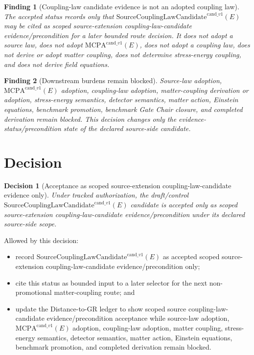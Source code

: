 \documentclass[11pt]{article}
\newcommand{\SCLC}{\mathrm{SourceCouplingLawCandidate}^{\mathrm{cand}\_v1}}
\newcommand{\MCPA}{\mathrm{MCPA}^{\mathrm{cand}\_v1}}
\newtheorem{decision}{Decision}
\newtheorem{finding}{Finding}
\begin{document}
\begin{finding}[Coupling-law candidate evidence is not an adopted coupling law]
The accepted status records only that \(\SCLC(E)\) may be cited as scoped
source-extension coupling-law-candidate evidence/precondition for a later
bounded route decision. It does not adopt a source law, does not adopt
\(\MCPA(E)\), does not adopt a coupling law, does not derive or adopt matter
coupling, does not determine stress-energy coupling, and does not derive
field equations.
\end{finding}

\begin{finding}[Downstream burdens remain blocked]
Source-law adoption, \(\MCPA(E)\) adoption, coupling-law adoption,
matter-coupling derivation or adoption, stress-energy semantics, detector
semantics, matter action, Einstein equations, benchmark promotion, benchmark
Gate Chair closure, and completed derivation remain blocked. This decision
changes only the evidence-status/precondition state of the declared
source-side candidate.
\end{finding}

\section{Decision}

\begin{decision}[Acceptance as scoped source-extension coupling-law-candidate evidence only]
Under tracked authorization, the draft/control \(\SCLC(E)\) candidate is
accepted only as scoped source-extension coupling-law-candidate
evidence/precondition under its declared source-side scope.
\end{decision}

Allowed by this decision:
\begin{itemize}[leftmargin=*]
  \item record \(\SCLC(E)\) as accepted scoped source-extension
  coupling-law-candidate evidence/precondition only;
  \item cite this status as bounded input to a later selector for the next
  non-promotional matter-coupling route; and
  \item update the Distance-to-GR ledger to show scoped source
  coupling-law-candidate evidence/precondition acceptance while source-law
  adoption, \(\MCPA(E)\) adoption, coupling-law adoption, matter coupling,
  stress-energy semantics, detector semantics, matter action, Einstein
  equations, benchmark promotion, and completed derivation remain blocked.
\end{itemize}
\end{document}
